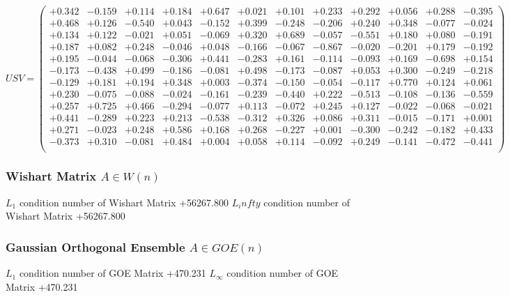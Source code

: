 \documentclass[9pt]{article}
\theoremstyle{plain}
\theoremstyle{definition}
\theoremstyle{remark}
\numberwithin{equation}{section}
\begin{document}
$U S V = \left(
\begin{array}{
cccccccccccc}
+0.342 & -0.159 & +0.114 & +0.184 & +0.647 & +0.021 & +0.101 & +0.233 & +0.292 & +0.056 & +0.288 & -0.395 \\
+0.468 & +0.126 & -0.540 & +0.043 & -0.152 & +0.399 & -0.248 & -0.206 & +0.240 & +0.348 & -0.077 & -0.024 \\
+0.134 & +0.122 & -0.021 & +0.051 & -0.069 & +0.320 & +0.689 & -0.057 & -0.551 & +0.180 & +0.080 & -0.191 \\
+0.187 & +0.082 & +0.248 & -0.046 & +0.048 & -0.166 & -0.067 & -0.867 & -0.020 & -0.201 & +0.179 & -0.192 \\
+0.195 & -0.044 & -0.068 & -0.306 & +0.441 & -0.283 & +0.161 & -0.114 & -0.093 & +0.169 & -0.698 & +0.154 \\
-0.173 & -0.438 & +0.499 & -0.186 & -0.081 & +0.498 & -0.173 & -0.087 & +0.053 & +0.300 & -0.249 & -0.218 \\
-0.129 & +0.181 & +0.194 & +0.348 & +0.003 & -0.374 & -0.150 & -0.054 & -0.117 & +0.770 & +0.124 & +0.061 \\
+0.230 & -0.075 & -0.088 & -0.024 & -0.161 & -0.239 & -0.440 & +0.222 & -0.513 & -0.108 & -0.136 & -0.559 \\
+0.257 & +0.725 & +0.466 & -0.294 & -0.077 & +0.113 & -0.072 & +0.245 & +0.127 & -0.022 & -0.068 & -0.021 \\
+0.441 & -0.289 & +0.223 & +0.213 & -0.538 & -0.312 & +0.326 & +0.086 & +0.311 & -0.015 & -0.171 & +0.001 \\
+0.271 & -0.023 & +0.248 & +0.586 & +0.168 & +0.268 & -0.227 & +0.001 & -0.300 & -0.242 & -0.182 & +0.433 \\
-0.373 & +0.310 & -0.081 & +0.484 & +0.004 & +0.058 & +0.114 & -0.092 & +0.249 & -0.141 & -0.472 & -0.441 \\
\end{array}
\right)$ \newline 

\subsubsection{Wishart Matrix $A \in W(n)$}
$L_1$ condition number of Wishart Matrix +56267.800
$L_infty$ condition number of Wishart Matrix +56267.800
\subsubsection{Gaussian Orthogonal Ensemble $A \in GOE(n)$}
$L_1$ condition number of GOE Matrix +470.231
$L_\infty$ condition number of GOE Matrix +470.231
\end{document}

